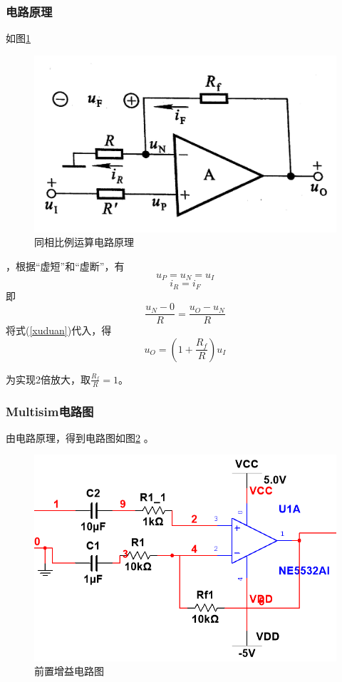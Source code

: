 \documentclass[12pt]{article}
\begin{document}
\subsubsection{电路原理}
如图\ref{txblyl}
\begin{figure}[htbp]
  \centering
  \includegraphics[width=.5\textwidth]{picture/P1}
  \caption{同相比例运算电路原理}\label{txblyl}
\end{figure}
，根据“虚短”和“虚断”，有
\begin{equation}\label{xuduan}
  u_P=u_N=u_I
\end{equation}
\begin{equation}\label{xuduan2}
  i_R=i_F
\end{equation}
即
\begin{equation}\label{tuidao1}
  \frac{u_N-0}{R}=\frac{u_O-u_N}{R}
\end{equation}
将式(\ref{xuduan})代入，得
\begin{equation}\label{jielun}
  u_O=\left(1+\frac{R_f}{R}\right)u_I
\end{equation}\par
为实现2倍放大，取$\frac{R_f}{R}=1$。
\subsubsection{Multisim电路图}
由电路原理，得到电路图如图\ref{qzzydlt}
。
\begin{figure}[htbp]
  \centering
  \includegraphics[width=.6\textwidth]{picture/TIM20190505123940}
  \caption{前置增益电路图}\label{qzzydlt}
\end{figure}
\end{document}
